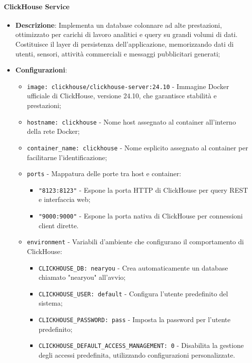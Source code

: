 \documentclass[10pt]{article}
\begin{document}
        \paragraph{ClickHouse Service}
        \begin{itemize} 
        \item \textbf{Descrizione}: Implementa un database colonnare ad alte prestazioni, ottimizzato per carichi di lavoro analitici e query su grandi volumi di dati. Costituisce il layer di persistenza dell'applicazione, memorizzando dati di utenti, sensori, attività commerciali e messaggi pubblicitari generati;
        \item \textbf{Configurazioni}:
        \begin{itemize}
            \item \texttt{image: clickhouse/clickhouse-server:24.10} - Immagine Docker ufficiale di ClickHouse, versione 24.10, che garantisce stabilità e prestazioni;
            \item \texttt{hostname: clickhouse} - Nome host assegnato al container all'interno della rete Docker;
            \item \texttt{container\_name: clickhouse} - Nome esplicito assegnato al container per facilitarne l'identificazione;
            \item \texttt{ports} - Mappatura delle porte tra host e container:
            \begin{itemize}
                \item \texttt{"8123:8123"} - Espone la porta HTTP di ClickHouse per query REST e interfaccia web;
                \item \texttt{"9000:9000"} - Espone la porta nativa di ClickHouse per connessioni client dirette.
            \end{itemize}
            \item \texttt{environment} - Variabili d'ambiente che configurano il comportamento di ClickHouse:
            \begin{itemize}
                \item \texttt{CLICKHOUSE\_DB: nearyou} - Crea automaticamente un database chiamato "nearyou" all'avvio;
                \item \texttt{CLICKHOUSE\_USER: default} - Configura l'utente predefinito del sistema;
                \item \texttt{CLICKHOUSE\_PASSWORD: pass} - Imposta la password per l'utente predefinito;
                \item \texttt{CLICKHOUSE\_DEFAULT\_ACCESS\_MANAGEMENT: 0} - Disabilita la gestione degli accessi predefinita, utilizzando configurazioni personalizzate.

\end{itemize}
\end{itemize}
\end{itemize}
\end{document}
